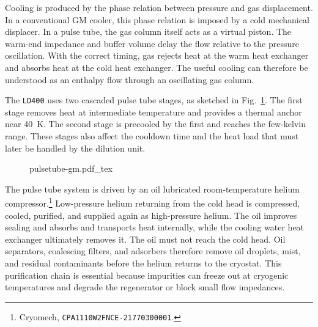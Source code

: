         Cooling is produced by the phase relation between pressure and gas displacement. In a conventional GM cooler, this phase relation is imposed by a cold mechanical displacer. In a pulse tube, the gas column itself acts as a virtual piston. The warm-end impedance and buffer volume delay the flow relative to the pressure oscillation. With the correct timing, gas rejects heat at the warm heat exchanger and absorbs heat at the cold heat exchanger. The useful cooling can therefore be understood as an enthalpy flow through an oscillating gas column.

        The \texttt{LD400} uses two cascaded pulse tube stages, as sketched in Fig.~\ref{fig:setup:pulse-tube-gm}. The first stage removes heat at intermediate temperature and provides a thermal anchor near \qty{40}{\kelvin}. The second stage is precooled by the first and reaches the few-kelvin range. These stages also affect the cooldown time and the heat load that must later be handled by the dilution unit.

        \begin{figure}[t]
            \centering
            \hfill
            \begin{minipage}[c]{0.4\textwidth}
                \centering
                {\fontsize{7}{9}\selectfont
                {pulsetube-gm.pdf_tex}}
            \end{minipage}
            \hfill
            \begin{minipage}[c]{0.55\textwidth}
                \label{fig:setup:pulse-tube-gm}
            \end{minipage}
            \hfill
        \end{figure}

        

        The pulse tube system is driven by an oil lubricated room-temperature helium compressor.\footnote{Cryomech, \texttt{CPA1110W2FNCE-21770300001}.} Low-pressure helium returning from the cold head is compressed, cooled, purified, and supplied again as high-pressure helium. The oil improves sealing and absorbs and transports heat internally, while the cooling water heat exchanger ultimately removes it. The oil must not reach the cold head. Oil separators, coalescing filters, and adsorbers therefore remove oil droplets, mist, and residual contaminants before the helium returns to the cryostat. This purification chain is essential because impurities can freeze out at cryogenic temperatures and degrade the regenerator or block small flow impedances.

